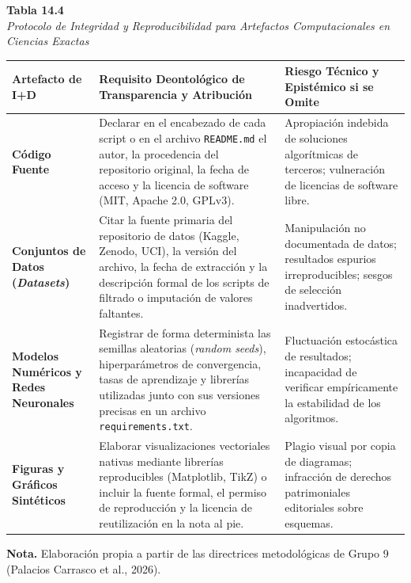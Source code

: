 \begin{table}[htbp]
\centering
\small
\renewcommand{\arraystretch}{1.25}
\textbf{Tabla 14.4}\\[0.15cm]
\textit{Protocolo de Integridad y Reproducibilidad para Artefactos Computacionales en Ciencias Exactas}\\[0.25cm]
\begin{tabularx}{\textwidth}{p{2.8cm}X p{5.5cm}}
\toprule
\textbf{Artefacto de I+D} & \textbf{Requisito Deontológico de Transparencia y Atribución} & \textbf{Riesgo Técnico y Epistémico si se Omite} \\
\midrule
\textbf{Código Fuente} & Declarar en el encabezado de cada script o en el archivo \texttt{README.md} el autor, la procedencia del repositorio original, la fecha de acceso y la licencia de software (MIT, Apache 2.0, GPLv3). & Apropiación indebida de soluciones algorítmicas de terceros; vulneración de licencias de software libre. \\
\textbf{Conjuntos de Datos (\textit{Datasets})} & Citar la fuente primaria del repositorio de datos (Kaggle, Zenodo, UCI), la versión del archivo, la fecha de extracción y la descripción formal de los scripts de filtrado o imputación de valores faltantes. & Manipulación no documentada de datos; resultados espurios irreproducibles; sesgos de selección inadvertidos. \\
\textbf{Modelos Numéricos y Redes Neuronales} & Registrar de forma determinista las semillas aleatorias (\textit{random seeds}), hiperparámetros de convergencia, tasas de aprendizaje y librerías utilizadas junto con sus versiones precisas en un archivo \texttt{requirements.txt}. & Fluctuación estocástica de resultados; incapacidad de verificar empíricamente la estabilidad de los algoritmos. \\
\textbf{Figuras y Gráficos Sintéticos} & Elaborar visualizaciones vectoriales nativas mediante librerías reproducibles (Matplotlib, TikZ) o incluir la fuente formal, el permiso de reproducción y la licencia de reutilización en la nota al pie. & Plagio visual por copia de diagramas; infracción de derechos patrimoniales editoriales sobre esquemas. \\
\bottomrule
\end{tabularx}
\vspace{0.15cm}
\raggedright \scriptsize \textbf{Nota.} Elaboración propia a partir de las directrices metodológicas de Grupo 9 (Palacios Carrasco et al., 2026).
\end{table}

